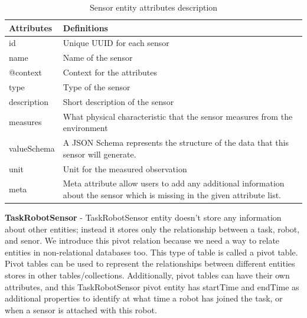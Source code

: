 	\begin{table}[h!]
		\begin{tabular}{|l|p{12cm}|}
			\hline
			\textbf{Attributes} & \textbf{Definitions} \\ \hline
			id & Unique UUID for each sensor \\ \hline
			name & Name of the sensor \\ \hline
			@context & Context for the attributes \\ \hline
			type & Type of the sensor \\ \hline
			description & Short description of the sensor \\ \hline
			measures & What physical characteristic that the sensor measures from the environment \\ \hline
			valueSchema & A JSON Schema represents the structure of the data that this sensor will generate. \\ \hline
			unit & Unit for the measured observation\\ \hline
			meta & Meta attribute allow users to add any additional information about the sensor which is missing in the given attribute list.\\ \hline
			
		\end{tabular}
		\caption{Sensor entity attributes description}
		\label{tab:sensor_entity}
	\end{table}

	\textbf{TaskRobotSensor} - TaskRobotSensor entity doesn't store any information about other entities; instead it stores only the relationship between a task, robot, and senor. We introduce this pivot relation because we need a way to relate entities in non-relational databases too. This type of table is called a pivot table. Pivot tables can be used to represent the relationships between different entities stores in other tables/collections. Additionally, pivot tables can have their own attributes, and this TaskRobotSensor pivot entity has startTime and endTime as additional properties to identify at what time a robot has joined the task, or when a sensor is attached with this robot. 
	
